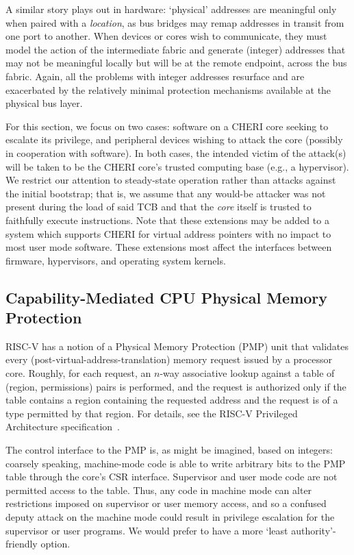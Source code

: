 A similar story plays out in hardware: `physical' addresses are meaningful
only when paired with a \emph{location}, as bus bridges may remap addresses
in transit from one port to another.  When devices or cores wish to
communicate, they must model the action of the intermediate fabric and
generate (integer) addresses that may not be meaningful locally but will be
at the remote endpoint, across the bus fabric.  Again, all the problems with
integer addresses resurface and are exacerbated by the relatively minimal
protection mechanisms available at the physical bus layer.

For this section, we focus on two cases: software on a CHERI core seeking to
escalate its privilege, and peripheral devices wishing to attack the core
(possibly in cooperation with software).  In both cases, the intended victim
of the attack(s) will be taken to be the CHERI core's trusted computing base
(e.g., a hypervisor).  We restrict our attention to steady-state operation
rather than attacks against the initial bootstrap; that is, we assume that
any would-be attacker was not present during the load of said TCB and that
the \emph{core} itself is trusted to faithfully execute instructions.
Note that these extensions may be added to a system which supports
CHERI for virtual address pointers with no impact to most user mode
software.  These extensions most affect the interfaces between
firmware, hypervisors, and operating system kernels.

\subsection{Capability-Mediated CPU Physical Memory Protection} %

RISC-V has a notion of a Physical Memory Protection (PMP) unit that
validates every (post-virtual-address-translation) memory request issued by
a processor core.  Roughly, for each request, an $n$-way associative lookup
against a table of (region, permissions) pairs is performed, and the request
is authorized only if the table contains a region containing the requested
address and the request is of a type permitted by that region.  For details,
see the RISC-V Privileged Architecture specification~\cite[\S
3.6]{RISCV:Privileged:1.11}.

The control interface to the PMP is, as might be imagined, based on
integers: coarsely speaking, machine-mode code is able to write arbitrary
bits to the PMP table through the core's CSR interface.  Supervisor and user
mode code are not permitted access to the table.  Thus, any code in machine
mode can alter restrictions imposed on supervisor or user memory access, and
so a confused deputy attack on the machine mode could result in privilege
escalation for the supervisor or user programs.  We would prefer to have a
more `least authority'-friendly option.

